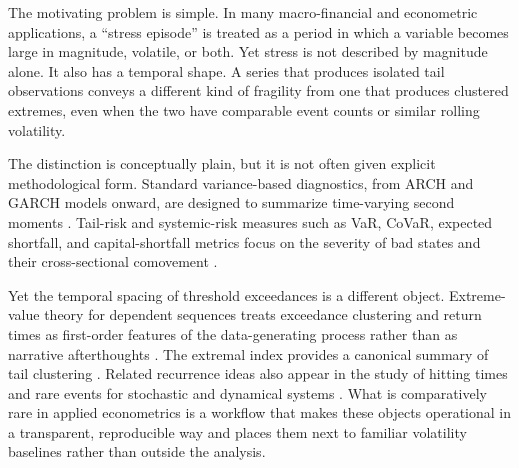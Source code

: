 \documentclass[11pt]{article}
\begin{document}
The motivating problem is simple. In many macro-financial and econometric applications, a ``stress episode'' is treated as a period in which a variable becomes large in magnitude, volatile, or both. Yet stress is not described by magnitude alone. It also has a temporal shape. A series that produces isolated tail observations conveys a different kind of fragility from one that produces clustered extremes, even when the two have comparable event counts or similar rolling volatility.

The distinction is conceptually plain, but it is not often given explicit methodological form. Standard variance-based diagnostics, from ARCH and GARCH models onward, are designed to summarize time-varying second moments \cite{engle1982,bollerslev1986}. Tail-risk and systemic-risk measures such as VaR, CoVaR, expected shortfall, and capital-shortfall metrics focus on the severity of bad states and their cross-sectional comovement \cite{adrian2016,acharya2017,brownlees2017,bisias2012}.

Yet the temporal spacing of threshold exceedances is a different object. Extreme-value theory for dependent sequences treats exceedance clustering and return times as first-order features of the data-generating process rather than as narrative afterthoughts \cite{leadbetter1983,embrechts1997,coles2001}. The extremal index provides a canonical summary of tail clustering \cite{obrien1987,ferro2003,suveges2007}. Related recurrence ideas also appear in the study of hitting times and rare events for stochastic and dynamical systems \cite{hirata1999,freitas2010,lucarini2016}. What is comparatively rare in applied econometrics is a workflow that makes these objects operational in a transparent, reproducible way and places them next to familiar volatility baselines rather than outside the analysis.
\end{document}
